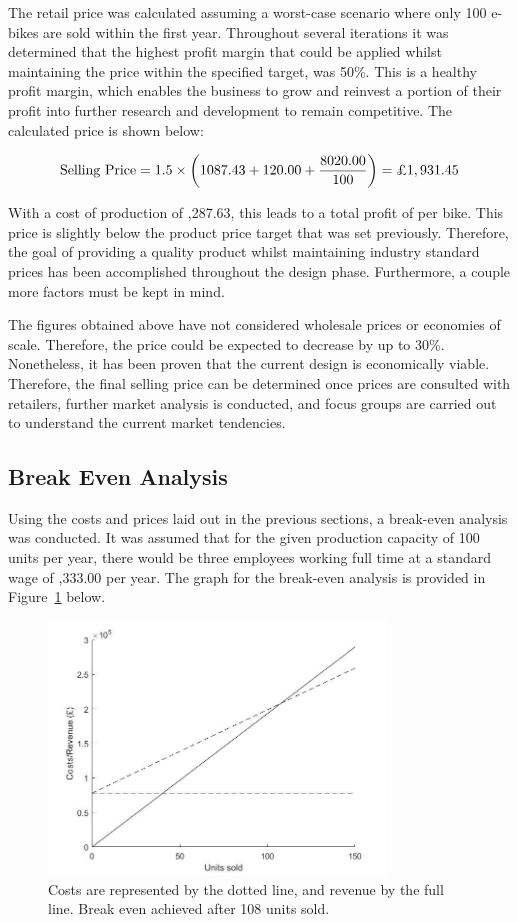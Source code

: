 \documentclass[a4paper,11pt]{article}
\begin{document}
The retail price was calculated assuming a worst-case scenario where only 100 e-bikes are sold within the first year. Throughout several iterations it was determined that the highest profit margin that could be applied whilst maintaining the price within the specified target, was 50\%. This is a healthy profit margin, which enables the business to grow and reinvest a portion of their profit into further research and development to remain competitive. The calculated price is shown below: 

\[
	\text{Selling Price} = 1.5 \times \left(1087.43+120.00+\frac{8020.00}{100}\right) =\text{\textsterling}1,931.45
\]

With a cost of production of ,287.63, this leads to a total profit of  per bike. This price is slightly below the product price target that was set previously. Therefore, the goal of providing a quality product whilst maintaining industry standard prices has been accomplished throughout the design phase. Furthermore, a couple more factors must be kept in mind. 

The figures obtained above have not considered wholesale prices or economies of scale. Therefore, the price could be expected to decrease by up to 30\%. Nonetheless, it has been proven that the current design is economically viable. Therefore, the final selling price can be determined once prices are consulted with retailers, further market analysis is conducted, and focus groups are carried out to understand the current market tendencies.  

\subsection{Break Even Analysis}

Using the costs and prices laid out in the previous sections, a break-even analysis was conducted. It was assumed that for the given production capacity of 100 units per year, there would be three employees working full time at a standard wage of ,333.00 per year. The graph for the break-even analysis is provided in Figure~\ref{fig:roi} below.

\begin{figure}[!ht]
	\centering
	\includegraphics[width=0.8\textwidth]{geg2}
	\caption{Costs are represented by the dotted line, and revenue by the full line. Break even achieved after 108 units sold.}
	\label{fig:roi}
\end{figure}
\end{document}

